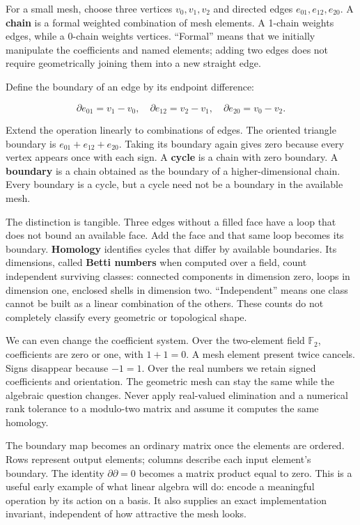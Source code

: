 For a small mesh, choose three vertices \(v_0,v_1,v_2\) and directed edges \(e_{01},e_{12},e_{20}\). A \textbf{chain} is a formal weighted combination of mesh elements. A 1-chain weights edges, while a 0-chain weights vertices. ``Formal'' means that we initially manipulate the coefficients and named elements; adding two edges does not require geometrically joining them into a new straight edge.

Define the boundary of an edge by its endpoint difference:

\[
\partial e_{01}=v_1-v_0,\quad
\partial e_{12}=v_2-v_1,\quad
\partial e_{20}=v_0-v_2.
\]

Extend the operation linearly to combinations of edges. The oriented triangle boundary is \(e_{01}+e_{12}+e_{20}\). Taking its boundary again gives zero because every vertex appears once with each sign. A \textbf{cycle} is a chain with zero boundary. A \textbf{boundary} is a chain obtained as the boundary of a higher-dimensional chain. Every boundary is a cycle, but a cycle need not be a boundary in the available mesh.

The distinction is tangible. Three edges without a filled face have a loop that does not bound an available face. Add the face and that same loop becomes its boundary. \textbf{Homology} identifies cycles that differ by available boundaries. Its dimensions, called \textbf{Betti numbers} when computed over a field, count independent surviving classes: connected components in dimension zero, loops in dimension one, enclosed shells in dimension two. ``Independent'' means one class cannot be built as a linear combination of the others. These counts do not completely classify every geometric or topological shape.

We can even change the coefficient system. Over the two-element field \(\mathbb F_2\), coefficients are zero or one, with \(1+1=0\). A mesh element present twice cancels. Signs disappear because \(-1=1\). Over the real numbers we retain signed coefficients and orientation. The geometric mesh can stay the same while the algebraic question changes. Never apply real-valued elimination and a numerical rank tolerance to a modulo-two matrix and assume it computes the same homology.

The boundary map becomes an ordinary matrix once the elements are ordered. Rows represent output elements; columns describe each input element's boundary. The identity \(\partial\partial=0\) becomes a matrix product equal to zero. This is a useful early example of what linear algebra will do: encode a meaningful operation by its action on a basis. It also supplies an exact implementation invariant, independent of how attractive the mesh looks.

